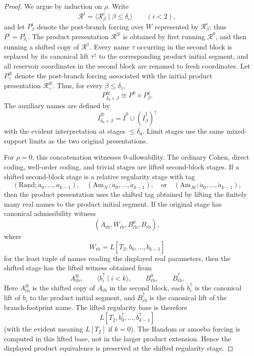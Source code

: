 \documentclass[a4paper,11pt]{article}
\begin{document}
\begin{proof}
We argue by induction on \(\rho\).  Write
\[
   \mathcal R^i=\langle \mathcal R^i_\beta\mid \beta\leq\delta_i\rangle
   \qquad (i<2),
\]
and let \(P^i_\beta\) denote the post-branch forcing over \(W\) represented by
\(\mathcal R^i_\beta\); thus \(P^i=P^i_{\delta_i}\).  The product presentation
\(\mathcal R^\otimes\) is obtained by first running \(\mathcal R^0\), and then
running a shifted copy of \(\mathcal R^1\).  Every name \(\dot\tau\) occurring in the second block is
replaced by its canonical lift \(\dot\tau^\uparrow\) to the corresponding
product initial segment, and all reservoir coordinates in the second block are
renamed to fresh coordinates.  Let \(P^\otimes_\gamma\) denote the post-branch forcing associated with the
initial product presentation \(\mathcal R^\otimes_\gamma\).  Thus, for every
\(\beta\leq\delta_1\),
\[
   P^\otimes_{\delta_0+\beta}
   \cong
   P^0\times P^1_\beta .
\]
The auxiliary names are defined by
\[
   \dot I^\otimes_{\delta_0+\beta}
   =
   \dot I^0\cup(\dot I^1_\beta)^\uparrow
\]
with the evident interpretation at stages \(\leq\delta_0\).  Limit stages use
the same mixed-support limits as the two original presentations.

For \(\rho=0\), this concatenation witnesses \(0\)-allowability.  The ordinary
Cohen, direct coding, well-order coding, and trivial stages are lifted
second-block stages.  If a shifted second-block stage is a relative regularity
stage with tag
\[
   (\mathrm{Rand};\dot a_0,\ldots,\dot a_{k-1}),
   \quad
   (\mathrm{Am}_{\mathcal N};\dot a_0,\ldots,\dot a_{k-1}),
   \quad\text{or}\quad
   (\mathrm{Am}_{\mathcal M};\dot a_0,\ldots,\dot a_{k-1}),
\]
then the product presentation uses the shifted tag obtained by lifting the
finitely many real names to the product initial segment.  If the original stage
has canonical admissibility witness
\[
   (A_{\mathrm{rb}},\dot W_{\mathrm{rb}},B^0_{\mathrm{rb}},\dot B_{\mathrm{rb}}),
\]
where
\[
   \dot W_{\mathrm{rb}}=L[T_2,\dot b_0,\ldots,\dot b_{k-1}]
\]
for the least tuple of names reading the displayed real parameters, then the
shifted stage has the lifted witness obtained from
\[
   A_{\mathrm{rb}}^\otimes,
   \qquad
   \langle \dot b_i^\uparrow\mid i<k\rangle,
   \qquad
   B^0_{\mathrm{rb}},
   \qquad
   \dot B_{\mathrm{rb}}^\uparrow.
\]
Here \(A_{\mathrm{rb}}^\otimes\) is the shifted copy of
\(A_{\mathrm{rb}}\) in the second block, each \(\dot b_i^\uparrow\) is the
canonical lift of \(\dot b_i\) to the product initial segment, and
\(\dot B_{\mathrm{rb}}^\uparrow\) is the canonical lift of the branch-footprint
name.  The lifted regularity base is therefore
\[
   L[T_2,\dot b_0^\uparrow,\ldots,\dot b_{k-1}^\uparrow]
\]
(with the evident meaning \(L[T_2]\) if \(k=0\)).  The Random or amoeba forcing
is computed in this lifted base, not in the larger product extension.  Hence the
displayed product equivalence is preserved at the shifted regularity stage.


\end{proof}
\end{document}
